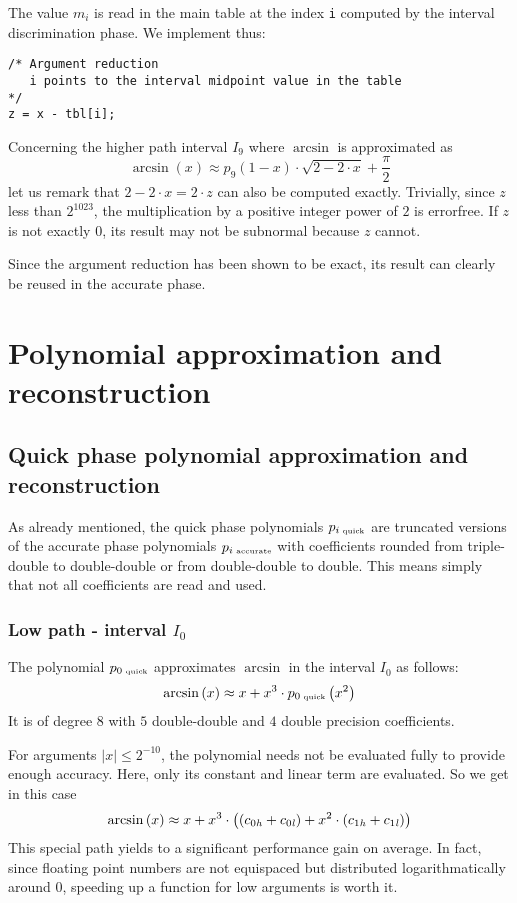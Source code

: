 The value $m_i$ is read in the main table at the index {\tt i}
computed by the interval discrimination phase. We implement thus:
\begin{lstlisting}[caption={Argument reduction},firstnumber=1]
/* Argument reduction
   i points to the interval midpoint value in the table
*/
z = x - tbl[i];
\end{lstlisting}

Concerning the higher path interval $I_9$ where $\arcsin$ is
approximated as
$$\arcsin\left( x \right) \approx p_9\left( 1 - x \right) \cdot
\sqrt{2 - 2\cdot x} + \frac{\pi}{2}$$ let us remark that $2 - 2\cdot x
= 2 \cdot z$ can also be computed exactly. Trivially, since $z$ less
than $2^{1023}$, the multiplication by a positive integer power of $2$
is errorfree. If $z$ is not exactly $0$, its result may not be
subnormal because $z$ cannot.

Since the argument reduction has been shown to be exact, its result
can clearly be reused in the accurate phase.

\section{Polynomial approximation and reconstruction}\label{sec:asinpolynomial}
\subsection{Quick phase polynomial approximation and reconstruction}\label{subsec:asinquickpolynomial}
As already mentioned, the quick phase polynomials $p_{i\mbox{\tiny ~quick}}$
are truncated versions of the accurate phase polynomials
$p_{i\mbox{\tiny ~accurate}}$ with coefficients rounded from
triple-double to double-double or from double-double to double. This
means simply that not all coefficients are read and used.
\subsubsection{Low path - interval $I_0$}
The polynomial $p_{0\mbox{\tiny ~quick}}$ approximates $\arcsin$ in the interval $I_0$ as follows:
$$\arcsin\left( x \right) \approx x + x^3 \cdot p_{0\mbox{\tiny ~quick}}\left( x^2 \right)$$
It is of degree $8$ with $5$ double-double and $4$ double precision
coefficients.

For arguments $\left \vert x \right \vert \leq 2^{-10}$, the
polynomial needs not be evaluated fully to provide enough accuracy.
Here, only its constant and linear term are evaluated. So we get in this case
$$\arcsin\left( x \right) \approx x + x^3 \cdot \left( \left( c_{0\mathit{h}} + c_{0\mathit{l}} \right) +
  x^2 \cdot \left( c_{1\mathit{h}} + c_{1\mathit{l}} \right) \right)$$ This special
path yields to a significant performance gain on average. In fact,
since floating point numbers are not equispaced but distributed
logarithmatically around $0$, speeding up a function for low arguments
is worth it.

